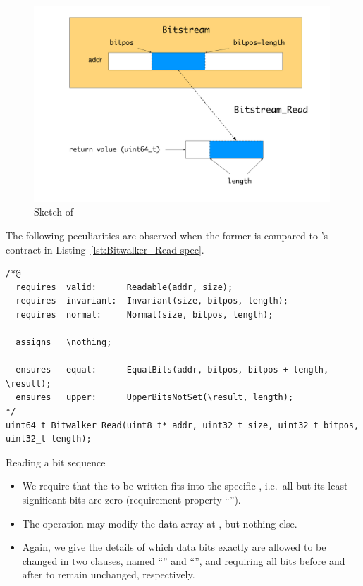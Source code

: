 \begin{figure}[hbt]
\begin{center}
\includegraphics[width=0.99\textwidth]{figures/bitstream-read.pdf}
\caption{\label{fig:bitstream-read}
        Sketch of }
\end{center}
\end{figure}



The following peculiarities are observed when the former is
compared to 's contract in Listing~\ref{lst:Bitwalker_Read spec}.

\begin{listing}[hbt]
\begin{minipage}{0.99\textwidth}
\begin{lstlisting}[style=acsl-block]
/*@
  requires  valid:      Readable(addr, size);
  requires  invariant:  Invariant(size, bitpos, length);
  requires  normal:     Normal(size, bitpos, length);

  assigns   \nothing;

  ensures   equal:      EqualBits(addr, bitpos, bitpos + length, \result);
  ensures   upper:      UpperBitsNotSet(\result, length);
*/
uint64_t Bitwalker_Read(uint8_t* addr, uint32_t size, uint32_t bitpos, uint32_t length);
\end{lstlisting}
\end{minipage}
\caption{\label{lst:Bitwalker_Read spec}Reading a bit sequence}
\end{listing}

\clearpage

\begin{itemize}
\item We require that the  to be written fits into
the specific
	, i.e.\ all but its 
	least significant bits are
	zero (requirement property ``'').
\item The operation may modify the data array at ,
but nothing else.
\item Again, we give the details of which data bits exactly
	are allowed to be changed in two
	 clauses, named ``'' and
	``'', and requiring all bits before
	 and after
	 to remain unchanged, respectively.
\end{itemize}

